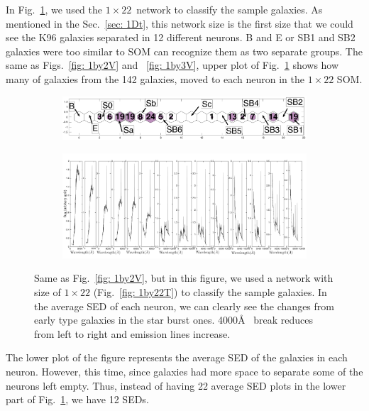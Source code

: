             In Fig.~\ref{fig: 1by22V}, we used the $1\times22$~network to classify the sample galaxies.
            As mentioned in the Sec.~\ref{sec: 1Dt}, this network size is the first size that we could see the K96 galaxies separated in 12 different neurons.
            B and E or SB1 and SB2 galaxies were too similar to SOM can recognize them as two separate groups.
            The same as Figs.~\ref{fig: 1by2V} and ~\ref{fig: 1by3V}, upper plot of Fig.~\ref{fig: 1by22V} shows how many of galaxies from the 142 galaxies, moved to each neuron in the $1\times22$ SOM.
            \begin{figure}
                \begin{subfigure}[b]{0.9\textwidth}
                    \centering
                    \includegraphics[width=\textwidth]{../images0.01/1d/hit_v_1_by_22_n.png}
                \end{subfigure}
                \hfill
                \begin{subfigure}[b]{0.9\textwidth}
                     \includegraphics[width=\textwidth]{../images0.01/1d/SED_total1by22.png}
                \end{subfigure}
                \caption{Same as Fig.~\ref{fig: 1by2V}, but in this figure, we used a network with size of $1\times22$ (Fig.~\ref{fig: 1by22T}) to classify the sample galaxies. In the average SED of each neuron, we can clearly see the changes from early type galaxies in the star burst ones. 4000\AA~ break reduces from left to right and emission lines increase.}
                \label{fig: 1by22V}
            \end{figure}
            The lower plot of the figure represents the average SED of the galaxies in each neuron.
            However, this time, since galaxies had more space to separate some of the neurons left empty. 
            Thus, instead of having 22 average SED plots in the lower part of Fig.~\ref{fig: 1by22V}, we have 12 SEDs.
            

